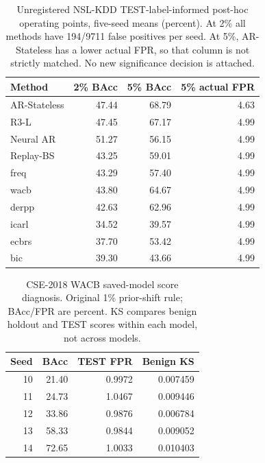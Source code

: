 \begin{table}[htbp]\centering\small
\caption{Unregistered NSL-KDD TEST-label-informed post-hoc operating points, five-seed means (percent). At 2\% all methods have 194/9711 false positives per seed. At 5\%, AR-Stateless has a lower actual FPR, so that column is not strictly matched. No new significance decision is attached.}
\label{tab:nsl-completed-posthoc}
\begin{tabular}{lrrr}\toprule
Method & 2\% BAcc & 5\% BAcc & 5\% actual FPR\\\midrule
AR-Stateless & 47.44 & 68.79 & 4.63\\
R3-L & 47.45 & 67.17 & 4.99\\
Neural AR & 51.27 & 56.15 & 4.99\\
Replay-BS & 43.25 & 59.01 & 4.99\\
freq & 43.29 & 57.40 & 4.99\\
wacb & 43.80 & 64.67 & 4.99\\
derpp & 42.63 & 62.96 & 4.99\\
icarl & 34.52 & 39.57 & 4.99\\
ecbrs & 37.70 & 53.42 & 4.99\\
bic & 39.30 & 43.66 & 4.99\\
\bottomrule\end{tabular}\end{table}
\begin{table}[htbp]\centering\small
\caption{CSE-2018 WACB saved-model score diagnosis. Original 1\% prior-shift rule; BAcc/FPR are percent. KS compares benign holdout and TEST scores within each model, not across models.}
\label{tab:wacb-completed-score}
\begin{tabular}{rrrr}\toprule
Seed & BAcc & TEST FPR & Benign KS\\\midrule
10 & 21.40 & 0.9972 & 0.007459\\
11 & 24.73 & 1.0467 & 0.009446\\
12 & 33.86 & 0.9876 & 0.006784\\
13 & 58.33 & 0.9844 & 0.009052\\
14 & 72.65 & 1.0033 & 0.010403\\
\bottomrule\end{tabular}\end{table}
